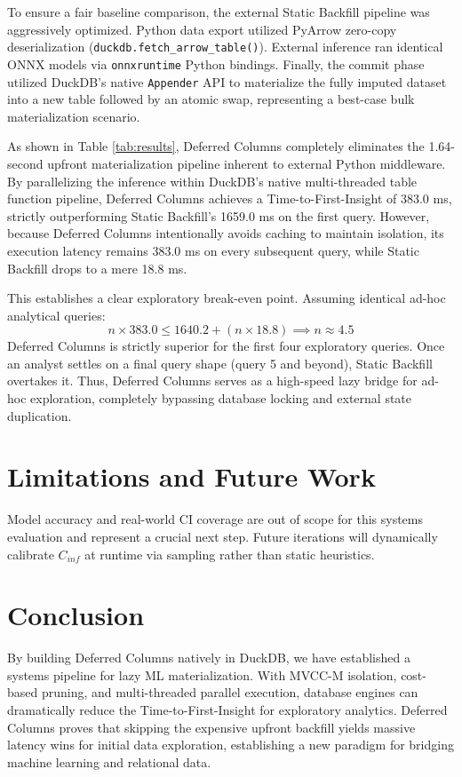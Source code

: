 \documentclass[conference]{IEEEtran}
\begin{document}
To ensure a fair baseline comparison, the external Static Backfill pipeline was aggressively optimized. Python data export utilized PyArrow zero-copy deserialization (\texttt{duckdb.fetch\_arrow\_table()}). External inference ran identical ONNX models via \texttt{onnxruntime} Python bindings. Finally, the commit phase utilized DuckDB's native \texttt{Appender} API to materialize the fully imputed dataset into a new table followed by an atomic swap, representing a best-case bulk materialization scenario.

As shown in Table \ref{tab:results}, Deferred Columns completely eliminates the 1.64-second upfront materialization pipeline inherent to external Python middleware. By parallelizing the inference within DuckDB's native multi-threaded table function pipeline, Deferred Columns achieves a Time-to-First-Insight of 383.0 ms, strictly outperforming Static Backfill's 1659.0 ms on the first query. However, because Deferred Columns intentionally avoids caching to maintain isolation, its execution latency remains 383.0 ms on every subsequent query, while Static Backfill drops to a mere 18.8 ms. 

This establishes a clear exploratory break-even point. Assuming identical ad-hoc analytical queries:
\begin{equation}
n \times 383.0 \leq 1640.2 + (n \times 18.8) \implies n \approx 4.5
\end{equation}
Deferred Columns is strictly superior for the first four exploratory queries. Once an analyst settles on a final query shape (query 5 and beyond), Static Backfill overtakes it. Thus, Deferred Columns serves as a high-speed lazy bridge for ad-hoc exploration, completely bypassing database locking and external state duplication.

\section{Limitations and Future Work}
Model accuracy and real-world CI coverage are out of scope for this systems evaluation and represent a crucial next step. Future iterations will dynamically calibrate $C_{inf}$ at runtime via sampling rather than static heuristics.

\section{Conclusion}
By building Deferred Columns natively in DuckDB, we have established a systems pipeline for lazy ML materialization. With MVCC-M isolation, cost-based pruning, and multi-threaded parallel execution, database engines can dramatically reduce the Time-to-First-Insight for exploratory analytics. Deferred Columns proves that skipping the expensive upfront backfill yields massive latency wins for initial data exploration, establishing a new paradigm for bridging machine learning and relational data.
\end{document}
